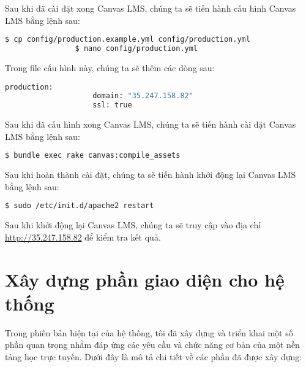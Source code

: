 \documentclass[../Thesis.tex]{subfiles}
\begin{document}
\begin{enumerate}
            Sau khi đã cài đặt xong Canvas LMS, chúng ta sẽ tiến hành cấu hình Canvas LMS bằng lệnh sau:
            \begin{lstlisting}[language=bash]
                $ cp config/production.example.yml config/production.yml
                $ nano config/production.yml
            \end{lstlisting}

            Trong file cấu hình này, chúng ta sẽ thêm các dòng sau:
            \begin{lstlisting}[language=bash]
                production:
                    domain: "35.247.158.82"
                    ssl: true
            \end{lstlisting}

            Sau khi đã cấu hình xong Canvas LMS, chúng ta sẽ tiến hành cài đặt Canvas LMS bằng lệnh sau:
            \begin{lstlisting}[language=bash]
                $ bundle exec rake canvas:compile_assets
            \end{lstlisting}

        Sau khi hoàn thành cài đặt, chúng ta sẽ tiến hành khởi động lại Canvas LMS bằng lệnh sau:
            \begin{lstlisting}[language=bash]
                $ sudo /etc/init.d/apache2 restart
            \end{lstlisting}

            Sau khi khởi động lại Canvas LMS, chúng ta sẽ truy cập vào địa chỉ \url{http://35.247.158.82} để kiểm tra kết quả.
        \end{enumerate}

\section{Xây dựng phần giao diện cho hệ thống}
\label{subsec:xay-dung-giao-dien}

    Trong phiên bản hiện tại của hệ thống, tôi đã xây dựng và triển khai một số phần quan trọng nhằm đáp ứng các yêu cầu và chức năng cơ bản của một nền tảng học trực tuyến. Dưới đây là mô tả chi tiết về các phần đã được xây dựng:
\end{document}
